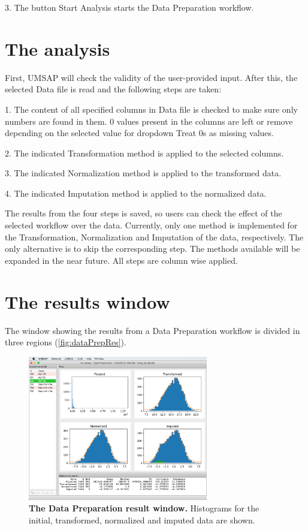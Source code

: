 \num{3}. The button Start Analysis starts the Data Preparation workflow.

\section{The analysis}

First, UMSAP will check the validity of the user-provided input. After this, the
selected Data file is read and the following steps are taken:

\num{1}. The content of all specified columns in Data file is checked to make sure
only numbers are found in them. \num{0} values present in the columns are left or
remove depending on the selected value for dropdown Treat \num{0}s as missing values.

\num{2}. The indicated Transformation method is applied to the selected columns.

\num{3}. The indicated Normalization method is applied to the transformed data.

\num{4}. The indicated Imputation method is applied to the normalized data.

The results from the four steps is saved, so users can check the effect of the selected
workflow over the data. Currently, only one method is implemented for the Transformation,
Normalization and Imputation of the data, respectively. The only alternative is to skip
the corresponding step. The methods available will be expanded in the near future.
All steps are column wise applied.

\section{The results window}

The window showing the results from a Data Preparation workflow is divided in three
regions (\autoref{fig:dataPrepRes}).

\begin{figure}[h]
    \centering
    \includegraphics[width=0.7\textwidth]{./IMAGES/DATAPREP/DataPrepRes.jpg}
    \caption[The Data Preparation result window]{\textbf{The Data Preparation
    result window.} Histograms for the initial, transformed, normalized and
    imputed data are shown. }
    \label{fig:dataPrepRes}
    \vspace{-5pt}
\end{figure}

